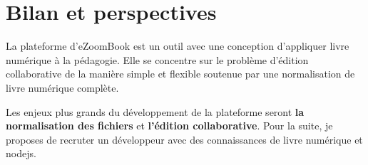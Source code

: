 \chapter{Bilan et perspectives}

La plateforme d'eZoomBook est un outil avec une conception d'appliquer livre numérique à la pédagogie. Elle se concentre sur le problème d'édition collaborative de la manière simple et flexible soutenue par une normalisation de livre numérique complète. 

Les enjeux plus grands du développement de la plateforme seront \textbf{la normalisation des fichiers} et \textbf{l'édition collaborative}. Pour la suite, je proposes de recruter un développeur avec des connaissances de livre numérique et nodejs.